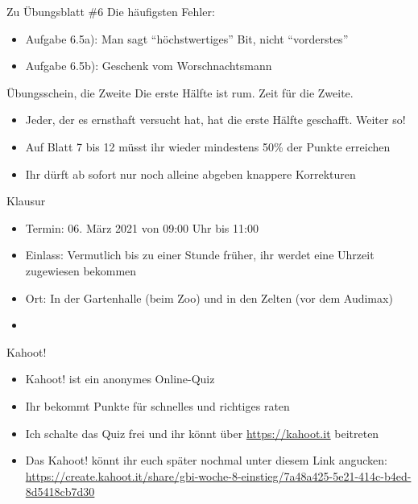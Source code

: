 \begin{frame}{Zu Übungsblatt \#6}
	Die häufigsten Fehler:
	\begin{itemize}[<+->]
		\item Aufgabe 6.5a): Man sagt ``höchstwertiges'' Bit, nicht ``vorderstes''
		\item Aufgabe 6.5b): Geschenk vom Worschnachtsmann
	\end{itemize}
\end{frame}

\begin{frame}{Übungsschein, die Zweite}
	Die erste Hälfte ist rum. Zeit für die Zweite.
	\begin{itemize}[<+->]
		\item Jeder, der es ernsthaft versucht hat, hat die erste Hälfte geschafft. Weiter so!
		\item Auf Blatt 7 bis 12 müsst ihr wieder mindestens 50\% der Punkte erreichen
		\item Ihr dürft ab sofort nur noch alleine abgeben
		\implitem knappere Korrekturen
	\end{itemize}
\end{frame}

\begin{frame}{Klausur}
	\begin{itemize}[<+->]
		\item Termin: 06. März 2021 von 09:00 Uhr bis 11:00
		\item Einlass: Vermutlich bis zu einer Stunde früher, ihr werdet eine Uhrzeit zugewiesen bekommen
		\item Ort: In der Gartenhalle (beim Zoo) und in den Zelten (vor dem Audimax)
		\item
	\end{itemize}
\end{frame}

\framePrevEpisode

\begin{frame}{Kahoot!}
	\begin{itemize}[<+->]
		\item Kahoot! ist ein anonymes Online-Quiz
		\item Ihr bekommt Punkte für schnelles und richtiges raten
		\item Ich schalte das Quiz frei und ihr könnt über \url{https://kahoot.it} beitreten
		\item Das Kahoot! könnt ihr euch später nochmal unter diesem Link angucken: \\
			\url{https://create.kahoot.it/share/gbi-woche-8-einstieg/7a48a425-5e21-414c-b4ed-8d5418cb7d30}
	\end{itemize}
\end{frame}

